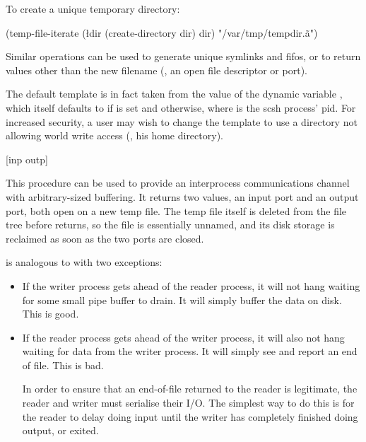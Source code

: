 \begin{desc}
    To create a unique temporary directory:
\begin{code}
(temp-file-iterate (\l{dir} (create-directory dir) dir)
                   "/var/tmp/tempdir.\~a")\end{code}
%
    Similar operations can be used to generate unique symlinks and fifos,
    or to return values other than the new filename (\eg, an open file
    descriptor or port).
    
    The default template is in fact taken from the value of the
    dynamic variable , which itself defaults
    to  if \TMPDIR{} is set and
     otherwise, where  is the
    scsh process' pid.  For increased security, a user may wish to
    change the template to use a directory not allowing world write
    access (\eg, his home directory).
\end{desc}

 {[inp outp]}
\begin{desc}
    This procedure can be used to provide an interprocess communications
    channel with arbitrary-sized buffering.  It returns two values, an input
    port and an output port, both open on a new temp file.  The temp file
    itself is deleted from the {\Unix} file tree before 
    returns, so the file is essentially unnamed, and its disk storage is
    reclaimed as soon as the two ports are closed.

     is analogous to  with two exceptions:
    \begin{itemize}
    \item If the writer process gets ahead of the reader process, it will
       not hang waiting for some small pipe buffer to drain. It will simply
       buffer the data on disk. This is good.

    \item If the reader process gets ahead of the writer process, it will
       also not hang waiting for data from the writer process. It will
       simply see and report an end of file. This is bad.

       In order to ensure that an end-of-file returned to the reader is
       legitimate, the reader and writer must serialise their I/O. The
       simplest way to do this is for the reader to delay doing input
       until the writer has completely finished doing output, or exited.
    \end{itemize}
\end{desc}

